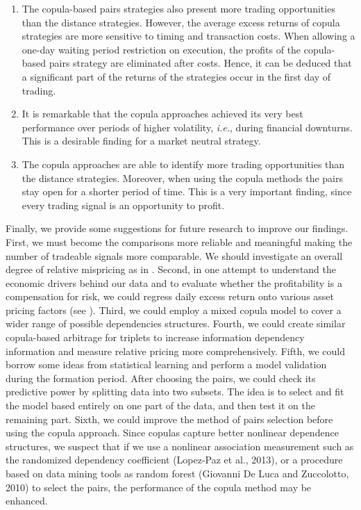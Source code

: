 \documentclass[a4paper,12pt]{report}
\begin{document}
\begin{refsection}
\begin{enumerate}
	\item The copula-based pairs strategies also present more trading opportunities than the distance strategies. However, the average excess returns of copula strategies are more sensitive to timing and transaction costs. When allowing a one-day waiting period restriction on execution, the profits of the copula-based pairs strategy are eliminated after costs. Hence, it can be deduced that a 
	significant part of the returns of the strategies occur in the first day of trading.
	\item It is remarkable that the copula approaches achieved its very best performance over periods of higher volatility, \emph{i.e.}, during financial downturns. This is a desirable finding for a market neutral strategy.
	\item The copula approaches are able to identify more trading opportunities than the distance strategies. Moreover, when using the copula methods the pairs stay open for a shorter period of time. This is a very important finding, since every trading signal is an opportunity to profit.
	
\end{enumerate}

\vspace{0.3cm}

Finally, we provide some suggestions for future research to improve our findings. First, we must become the comparisons more reliable and meaningful making the number of tradeable signals more comparable. We should investigate an overall degree of relative mispricing as in \citet*{rf15}. Second, in one attempt to understand the economic drivers behind our data and to evaluate whether the profitability is a compensation for risk, we could regress daily excess return onto various asset pricing factors (see \citet*{fama2012}). Third, we could employ a mixed copula model to cover a wider range of possible dependencies structures. Fourth, we could create similar copula-based arbitrage for triplets to increase information dependency information and measure relative pricing more comprehensively. Fifth, we could borrow some ideas from statistical learning and perform a model validation during the formation period. After choosing the pairs, we could check its predictive power by splitting data into two subsets. The idea is to select and fit the model based entirely on one part of the data, and then test it on the remaining part. Sixth, we could improve the method of pairs selection before using the copula approach. Since copulas capture better nonlinear dependence structures, we suspect that if we use a nonlinear association measurement such as the randomized dependency coefficient (Lopez-Paz et al., 2013), or a procedure based on data mining tools as random forest (Giovanni De Luca and Zuccolotto, 2010) to select the pairs, the performance of the copula method may be enhanced.

%
%
\printbibliography[title={REFERENCES}]
\end{refsection}
\end{document}
